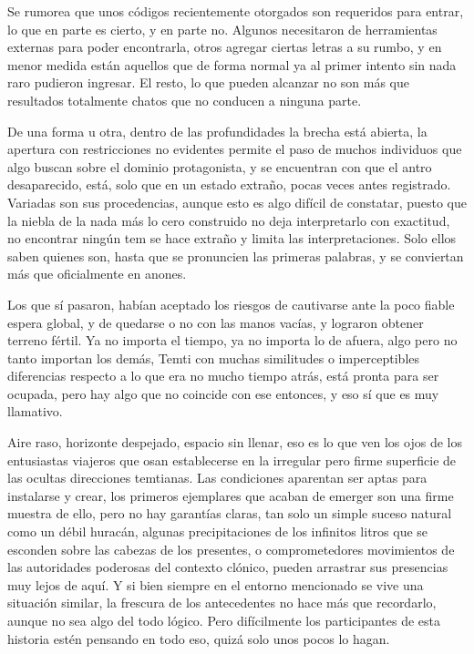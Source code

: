 \documentclass[
]{book}
\begin{document}
Se rumorea que unos códigos recientemente otorgados son requeridos para entrar, lo que en parte es cierto, y en parte no. Algunos necesitaron de herramientas externas para poder encontrarla, otros agregar ciertas letras a su rumbo, y en menor medida están aquellos que de forma normal ya al primer intento sin nada raro pudieron ingresar. El resto, lo que pueden alcanzar no son más que resultados totalmente chatos que no conducen a ninguna parte.

De una forma u otra, dentro de las profundidades la brecha está abierta, la apertura con restricciones no evidentes permite el paso de muchos individuos que algo buscan sobre el dominio protagonista, y se encuentran con que el antro desaparecido, está, solo que en un estado extraño, pocas veces antes registrado. Variadas son sus procedencias, aunque esto es algo difícil de constatar, puesto que la niebla de la nada más lo cero construido no deja interpretarlo con exactitud, no encontrar ningún tem se hace extraño y limita las interpretaciones. Solo ellos saben quienes son, hasta que se pronuncien las primeras palabras, y se conviertan más que oficialmente en anones.

Los que sí pasaron, habían aceptado los riesgos de cautivarse ante la poco fiable espera global, y de quedarse o no con las manos vacías, y lograron obtener terreno fértil. Ya no importa el tiempo, ya no importa lo de afuera, algo pero no tanto importan los demás, Temti con muchas similitudes o imperceptibles diferencias respecto a lo que era no mucho tiempo atrás, está pronta para ser ocupada, pero hay algo que no coincide con ese entonces, y eso sí que es muy llamativo.

Aire raso, horizonte despejado, espacio sin llenar, eso es lo que ven los ojos de los entusiastas viajeros que osan establecerse en la irregular pero firme superficie de las ocultas direcciones temtianas. Las condiciones aparentan ser aptas para instalarse y crear, los primeros ejemplares que acaban de emerger son una firme muestra de ello, pero no hay garantías claras, tan solo un simple suceso natural como un débil huracán, algunas precipitaciones de los infinitos litros que se esconden sobre las cabezas de los presentes, o comprometedores movimientos de las autoridades poderosas del contexto clónico, pueden arrastrar sus presencias muy lejos de aquí. Y si bien siempre en el entorno mencionado se vive una situación similar, la frescura de los antecedentes no hace más que recordarlo, aunque no sea algo del todo lógico. Pero difícilmente los participantes de esta historia estén pensando en todo eso, quizá solo unos pocos lo hagan.
\end{document}
